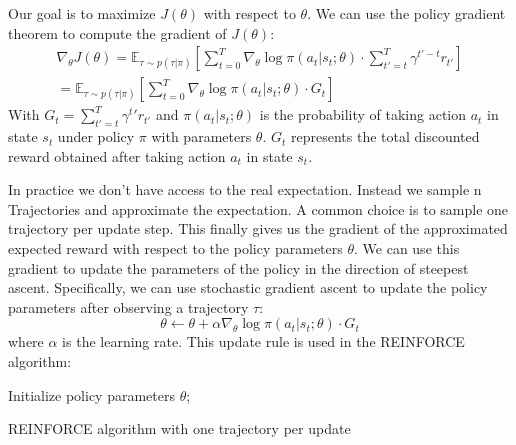 Our goal is to maximize $J(\theta)$ with respect to $\theta$. We can use the policy gradient theorem to compute the gradient of $J(\theta)$:
\begin{equation}
    \label{nabla_reinforce}
    \begin{aligned}
        \nabla_{\theta} J(\theta) = \mathbb{E}_{\tau \sim p(\tau | \pi)} \left[ \sum_{t=0}^T \nabla_{\theta} \log \pi(a_t|s_t;\theta) \cdot \sum_{t'=t}^T \gamma^{t'-t} r_{t'} \right]\\
        = \mathbb{E}_{\tau \sim p(\tau | \pi)} \left[ \sum_{t=0}^T \nabla_{\theta} \log \pi(a_t|s_t;\theta) \cdot  G_t\right]
    \end{aligned}
\end{equation}
With $G_t = \sum_{t'=t}^T \gamma^t' r_{t'}$ and $\pi(a_t|s_t;\theta)$ is the probability of taking action $a_t$ in state $s_t$ under policy $\pi$ with parameters $\theta$. 
$G_t$ represents the total discounted reward obtained after taking action $a_t$ in state $s_t$.

In practice we don't have access to the real expectation. Instead we sample n Trajectories and approximate the expectation.
A common choice is to sample one trajectory per update step. 
This finally gives us the gradient of the approximated expected reward with respect to the policy parameters $\theta$. We can use this gradient to update the parameters of the policy in the direction of steepest ascent. Specifically, we can use stochastic gradient ascent to update the policy parameters after observing a trajectory $\tau$:
\begin{equation}
\theta \leftarrow \theta + \alpha \nabla_{\theta} \log \pi(a_t|s_t;\theta) \cdot G_t
\end{equation}
where $\alpha$ is the learning rate. This update rule is used in the REINFORCE algorithm:

\begin{algorithm}[H]
    \SetAlgoLined
    Initialize policy parameters $\theta$;
    \caption{REINFORCE algorithm with one trajectory per update}
\end{algorithm}
    
